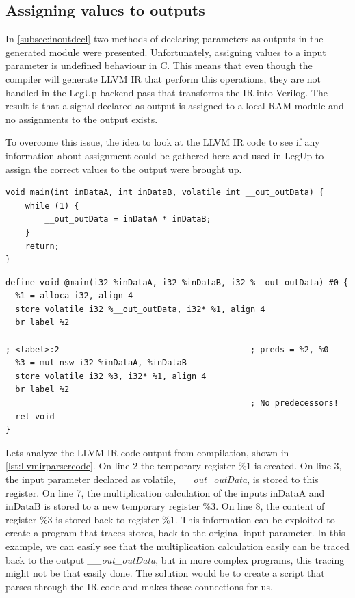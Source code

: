 \subsection{\label{sec:assValueToOutput}Assigning values to outputs}
In \cref{subsec:inoutdecl} two methods of declaring parameters as outputs in the generated module were presented. Unfortunately, assigning values to a input parameter is undefined behaviour in C. This means that even though the compiler will generate LLVM IR that perform this operations, they are not handled in the LegUp backend pass that transforms the IR into Verilog. The result is that a signal declared as output is assigned to a local RAM module and no assignments to the output exists.

To overcome this issue, the idea to look at the LLVM IR code to see if any information about assignment could be gathered here and used in LegUp to assign the correct values to the output were brought up. 
\lstset{language=C,style=Cstyle}
\begin{lstlisting}[caption={Simple C-code example for LLVM IR parsing},label=lst:cllvmirparsercode]
void main(int inDataA, int inDataB, volatile int __out_outData) {
    while (1) {
        __out_outData = inDataA * inDataB;
    }
    return;
}
\end{lstlisting}
\lstset{language=LLVM,style=LLVMStyle}
\begin{lstlisting}[caption={LLVM IR code for simple parsing example},label=lst:llvmirparsercode]
define void @main(i32 %inDataA, i32 %inDataB, i32 %__out_outData) #0 {
  %1 = alloca i32, align 4
  store volatile i32 %__out_outData, i32* %1, align 4
  br label %2

; <label>:2                                       ; preds = %2, %0
  %3 = mul nsw i32 %inDataA, %inDataB
  store volatile i32 %3, i32* %1, align 4
  br label %2
                                                  ; No predecessors!
  ret void
}
\end{lstlisting}
Lets analyze the LLVM IR code output from compilation, shown in \cref{lst:llvmirparsercode}. On line 2 the temporary register \%1 is created. On line 3, the input parameter declared as volatile, \textit{\_\_out\_outData}, is stored to this register. On line 7, the multiplication calculation of the inputs inDataA and inDataB is stored to a new temporary register \%3. On line 8, the content of register \%3 is stored back to register \%1. This information can be exploited to create a program that traces stores, back to the original input parameter. In this example, we can easily see that the multiplication calculation easily can be traced back to the output \textit{\_\_out\_outData}, but in more complex programs, this tracing might not be that easily done. The solution would be to create a script that parses through the IR code and makes these connections for us. 

